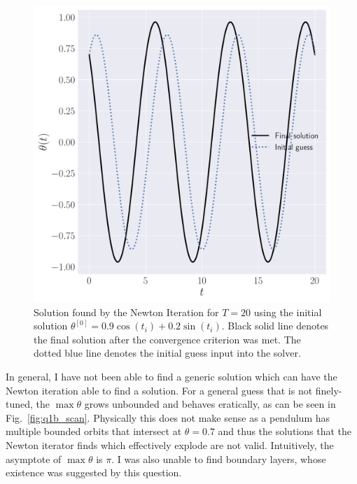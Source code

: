 \documentclass[12pt]{article}
\begin{document}
\begin{figure}
	\centering
	\includegraphics[clip,scale=0.3]{q1b_long_figure.pdf}
    \caption{
        Solution found by the Newton Iteration for $T=20$ using the initial solution $\theta^{[0]}=0.9\cos(t_{i})+0.2\sin(t_{i})$.
        Black solid line denotes the final solution after the convergence criterion was met. The dotted blue line denotes the initial guess
        input into the solver.
    }
    \label{fig:q1b_long}
\end{figure}

In general, I have not been able to find a generic solution which can have the Newton iteration able to find a solution. For a general guess
that is not finely-tuned, the $\max \theta$ grows unbounded and behaves eratically, as can be seen in Fig.~\ref{fig:q1b_scan}. Physically this does not make sense as a pendulum has multiple bounded orbits that intersect at $\theta = 0.7$ and thus the solutions that the Newton iterator finds which effectively explode are not valid. Intuitively, the asymptote of $\max\theta$ is $\pi$.  I was also unable to find boundary layers, whose existence was suggested by this question.
\end{document}

